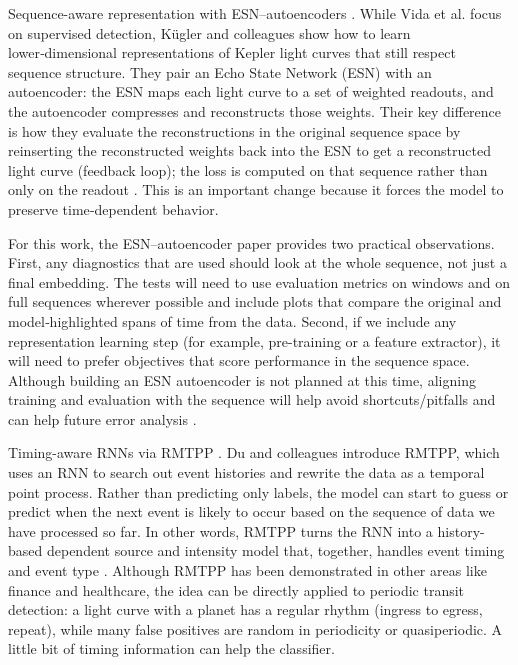 \documentclass[letterpaper]{article} %
\begin{document}
Sequence-aware representation with ESN–autoencoders \cite{kugler2016explorativeapproachkepler}. While Vida et al. focus on supervised detection, Kügler and colleagues show how to learn lower‑dimensional representations of Kepler light curves that still respect sequence structure. They pair an Echo State Network (ESN) with an autoencoder: the ESN maps each light curve to a set of weighted readouts, and the autoencoder compresses and reconstructs those weights. Their key difference is how they evaluate the reconstructions in the original sequence space by reinserting the reconstructed weights back into the ESN to get a reconstructed light curve (feedback loop); the loss is computed on that sequence rather than only on the readout \cite{kugler2016explorativeapproachkepler}. This is an important change because it forces the model to preserve time‑dependent behavior.

For this work, the ESN–autoencoder paper provides two practical observations. First, any diagnostics that are used should look at the whole sequence, not just a final embedding. The tests will need to use evaluation metrics on windows and on full sequences wherever possible and include plots that compare the original and model‑highlighted spans of time from the data. Second, if we include any representation learning step (for example, pre-training or a feature extractor), it will need to prefer objectives that score performance in the sequence space. Although building an ESN autoencoder is not planned at this time, aligning training and evaluation with the sequence will help avoid shortcuts/pitfalls and can help future error analysis \cite{kugler2016explorativeapproachkepler}.

Timing-aware RNNs via RMTPP \cite{Du2016markedtemporalpoint}. Du and colleagues introduce RMTPP, which uses an RNN to search out event histories and rewrite the data as a temporal point process. Rather than predicting only labels, the model can start to guess or predict when the next event is likely to occur based on the sequence of data we have processed so far. In other words, RMTPP turns the RNN into a history-based dependent source and intensity model that, together, handles event timing and event type \cite{Du2016markedtemporalpoint}. Although RMTPP has been demonstrated in other areas like finance and healthcare, the idea can be directly applied to periodic transit detection: a light curve with a planet has a regular rhythm (ingress to egress, repeat), while many false positives are random in periodicity or quasiperiodic. A little bit of timing information can help the classifier.
\end{document}
